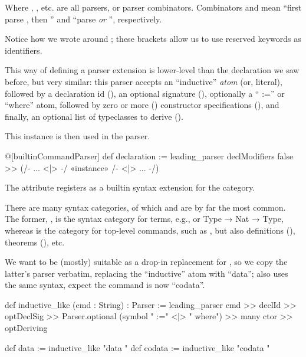 Where , , etc. are all parsers, or parser combinators. Combinators  and  mean ``first parse , then '' and ``parse  \emph{or} '', respectively.

\begin{remark}
    Notice how we wrote  around \inductive{}; these brackets allow us to use 
    reserved keywords as identifiers.
\end{remark}

This way of defining a parser extension is lower-level than the  declaration we saw before, but very similar: this parser accepts an ``inductive'' \emph{atom} (or, literal), followed by a declaration id (), an optional signature (), optionally a `` :='' or ``where'' atom, followed by zero or more () constructor specifications (), and finally, an optional list of typeclasses to derive ().

This  instance is then used in the  parser.
\begin{leancode}
  @[builtinCommandParser] def declaration := leading_parser
          declModifiers false >> (/- ... <|> -/ «instance» /- <|> ... -/)
\end{leancode}

The  attribute registers  as a builtin syntax extension for the  category.

\begin{remark}
    There are many syntax categories, of which  and  are by far the most common.
    The former, , is the syntax category for terms, e.g.,  or {Type → Nat → Type}, whereas  is the category for top-level commands, such as \inductive{}, but also definitions (), theorems (), etc.
  \end{remark}

We want \data{} to be (mostly) suitable as a drop-in replacement for \inductive{}, so we copy the latter's parser verbatim, replacing the ``inductive'' atom with ``data''; \codata{} also uses the same syntax, expect the command is now ``codata''.
\begin{leancode}
  def inductive_like (cmd : String) : Parser
    := leading_parser cmd >> declId  >> optDeclSig  
                        >> Parser.optional  (symbol " :=" <|> " where") 
                        >> many ctor 
                        >> optDeriving

  def data   := inductive_like "data "
  def codata := inductive_like "codata "
\end{leancode}

